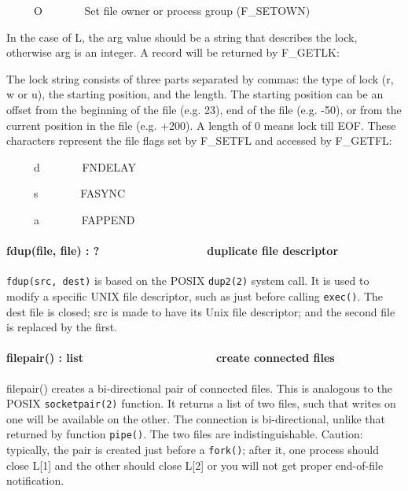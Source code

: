 \ \ \ \ \ O \ \ \ \ \ \ \ Set file owner or process group (F\_SETOWN)

In the case of L, the arg value should be a string that describes the
lock, otherwise arg is an integer. A record will be returned by
F\_GETLK: 


The lock string consists of three parts separated by commas: the type of
lock (r, w or u), the starting position, and the length. The starting
position can be an offset from the beginning of the file (e.g. 23), end
of the file (e.g. -50), or from the current position in the file (e.g.
+200). A length of 0 means lock till EOF. These characters represent
the file flags set by F\_SETFL and accessed by F\_GETFL: 

\ \ \ \ \ d \ \ \ \ \ \ \ FNDELAY 

\ \ \ \ \ s \ \ \ \ \ \ \ FASYNC 

\ \ \ \ \ a \ \ \ \ \ \ \ FAPPEND 

\paragraph[fdup(file, file) : ?\ \ \ \ \ \ \ \ \ \ \ \ 
\ \ \ \ \ duplicate file descriptor]{fdup(file, file) :
?\ \ \ \ \ \ \ \ \ \ \ \  \ \ \ \ \ duplicate file descriptor}
\texttt{fdup(src, dest)} is based on the POSIX \texttt{dup2(2)} system
call. It is used to
modify a specific UNIX file descriptor, such as just before calling
\texttt{exec()}. The dest file is closed; src is made to have its Unix file
descriptor; and the second file is replaced by the first. 

\paragraph[filepair() : list\ \ \ \ \ \ \ \ \ \ \ \ \ \ 
\ \ \ \ \ \ \ create connected files]{filepair() :
list\ \ \ \ \ \ \ \ \ \ \ \ \ \  \ \ \ \ \ \ \ create connected files}
filepair() creates a bi-directional pair of connected files. This is
analogous to the POSIX \texttt{socketpair(2)} function. It returns a list of two
files, such that writes on one will be available on the other. The
connection is bi-directional, unlike that returned by function \texttt{pipe()}.
The two files are indistinguishable. Caution: typically, the pair is
created just before a \texttt{fork()}; after it, one process should close L[1]
and the other should close L[2] or you will not get proper end-of-file
notification. 

